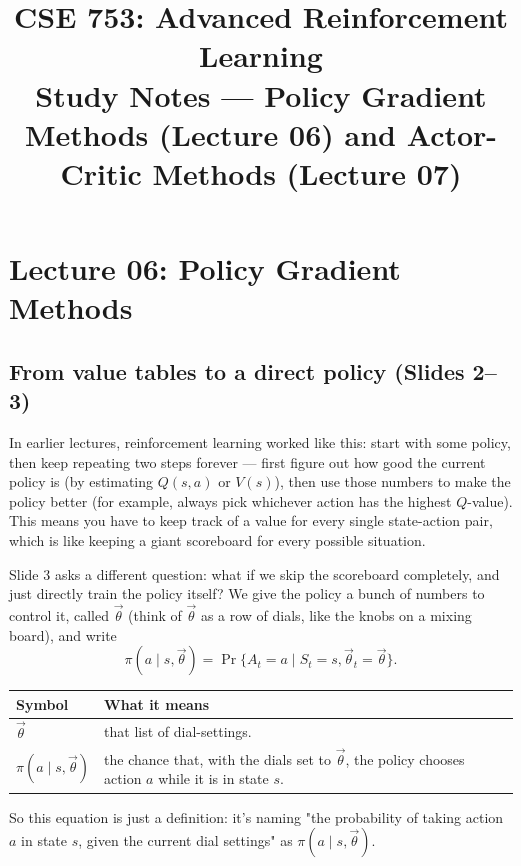 \documentclass[11pt]{article}
\title{CSE 753: Advanced Reinforcement Learning \\ \large Study Notes --- Policy Gradient Methods (Lecture 06) and Actor-Critic Methods (Lecture 07)}
\author{}
\date{}
\begin{document}
\maketitle
\sloppy

\section{Lecture 06: Policy Gradient Methods}

\subsection{From value tables to a direct policy (Slides 2--3)}

In earlier lectures, reinforcement learning worked like this: start with some policy, then keep repeating two steps forever --- first figure out how good the current policy is (by estimating $Q(s,a)$ or $V(s)$), then use those numbers to make the policy better (for example, always pick whichever action has the highest $Q$-value). This means you have to keep track of a value for every single state-action pair, which is like keeping a giant scoreboard for every possible situation.

Slide 3 asks a different question: what if we skip the scoreboard completely, and just directly train the policy itself? We give the policy a bunch of numbers to control it, called $\vec\theta$ (think of $\vec\theta$ as a row of dials, like the knobs on a mixing board), and write
$$\pi(a\mid s,\vec\theta) = \Pr\{A_t = a \mid S_t = s, \vec\theta_t = \vec\theta\}.$$
\begin{center}
\begin{tabular}{@{} >{\raggedright\arraybackslash}p{} >{\raggedright\arraybackslash}p{} @{}}
\toprule
\textbf{Symbol} & \textbf{What it means} \\
\midrule
$\vec\theta$ & that list of dial-settings. \\
$\pi(a\mid s,\vec\theta)$ & the chance that, with the dials set to $\vec\theta$, the policy chooses action $a$ while it is in state $s$. \\
\bottomrule
\end{tabular}
\end{center}
So this equation is just a definition: it's naming "the probability of taking action $a$ in state $s$, given the current dial settings" as $\pi(a\mid s,\vec\theta)$.
\end{document}
